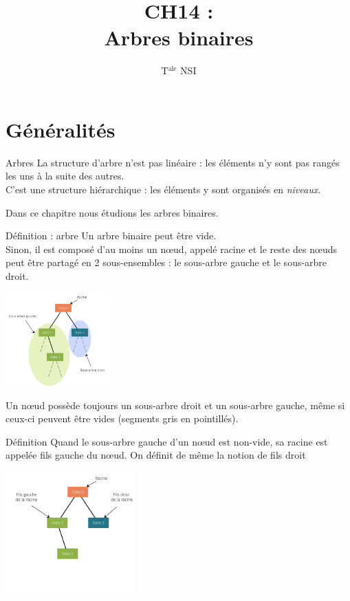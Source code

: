 \documentclass[10pt]{nsibeamer}
\title{CH14 : \\Arbres binaires}
\author{T$^{\text{ale}}$ NSI}
\begin{document}
\maketitle
\section{Généralités}
\begin{frame}{Arbres}
    La structure d'arbre n'est pas linéaire : les éléments n'y sont pas rangés les uns à la suite des autres.\\\pause
     C'est une structure \alert{hiérarchique} : les éléments y sont organisés en \textit{niveaux}.\\\pause
    
    Dans ce chapitre nous étudions les \alert{arbres binaires}.
\end{frame}

\begin{frame}{Définition : arbre}
    Un arbre binaire peut être vide.\\
    \pause
    Sinon, il est composé d'au moins un n\oe ud, appelé \alert{racine} et le reste des n\oe uds peut être partagé en 2 sous-ensembles : \pause le \alert{sous-arbre gauche} et le \alert{sous-arbre droit}.\pause
    \begin{center}
        \includegraphics[width=4cm]{img/arbre_bin_1}
    \end{center}\pause
Un n\oe ud possède toujours un sous-arbre droit et un sous-arbre gauche, même si ceux-ci peuvent être vides (segments gris en pointillés).
\end{frame}

\begin{frame}{Définition}
    Quand le sous-arbre gauche d'un n\oe ud est non-vide, sa racine est appelée \alert{fils gauche} du n\oe ud. On définit de même la notion de \alert{fils droit}
    \begin{center}
        \includegraphics[width=5cm]{img/arbre_bin_2}
    \end{center}
\end{frame}
\end{document}
